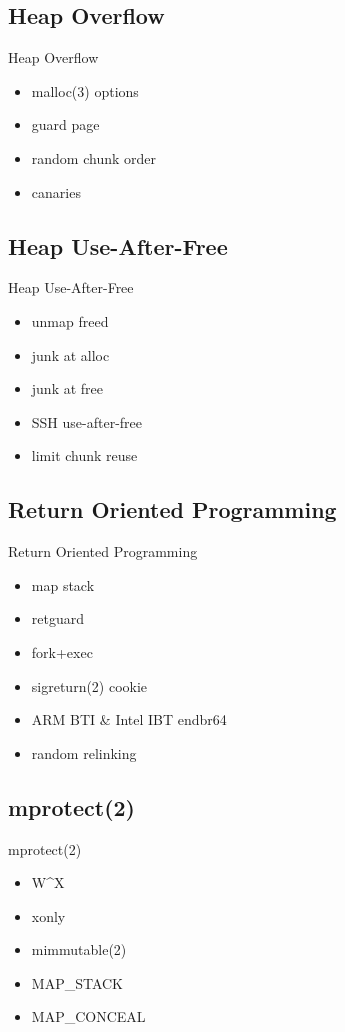 \documentclass[14pt,aspectratio=169]{beamer}
\begin{document}
\subsection{Heap Overflow}
\begin{frame}{Heap Overflow}
\begin{itemize}
  \item malloc(3) options
  \item guard page
  \item random chunk order
  \item canaries
\end{itemize}
\end{frame}

\subsection{Heap Use-After-Free}
\begin{frame}{Heap Use-After-Free}
\begin{itemize}
  \item unmap freed
  \item junk at alloc
  \item junk at free
  \item SSH use-after-free
  \item limit chunk reuse
\end{itemize}
\end{frame}

\subsection{Return Oriented Programming}
\begin{frame}{Return Oriented Programming}
\begin{itemize}
  \item map stack
  \item retguard
  \item fork+exec
  \item sigreturn(2) cookie
  \item ARM BTI \& Intel IBT endbr64
  \item random relinking
\end{itemize}
\end{frame}

\subsection{mprotect(2)}
\begin{frame}{mprotect(2)}
\begin{itemize}
  \item W\^{}X
  \item xonly
  \item mimmutable(2)
  \item MAP\_STACK
  \item MAP\_CONCEAL
\end{itemize}
\end{frame}
\end{document}
